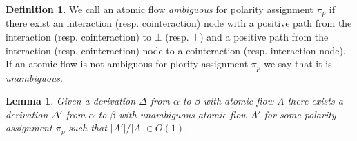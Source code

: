 \documentclass[a4paper]{amsart}
\newtheorem{lem}[thm]{Lemma}
\theoremstyle{remark}
\theoremstyle{definition}
\newtheorem{defi}[thm]{Definition}
\begin{document}
\begin{defi}
We call an atomic flow \emph{ambiguous} for polarity assignment $\pi_p$ if there exist an interaction (resp. cointeraction) node with a positive path from the interaction (resp. cointeraction) to $\bot$ (resp. $\top$) and a positive path from the interaction (resp. cointeraction) node to a cointeraction (resp. interaction node). If an atomic flow is not ambiguous for plority assignment $\pi_p$ we say that it is \emph{unambiguous}.
\end{defi}

\begin{lem}
Given a derivation $\Delta$ from $\alpha$ to $\beta$ with atomic flow $A$ there exists a derivation $\Delta'$ from $\alpha$ to $\beta$ with unambiguous atomic flow $A'$ for some polarity assignment $\pi_p$ such that $|A'|/|A|\in O(1)$.
\end{lem}
\end{document}
